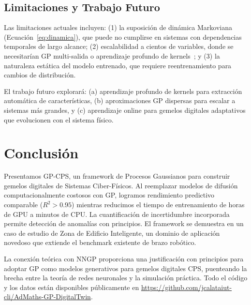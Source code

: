 \documentclass[conference]{IEEEtran}
\begin{document}
\subsection{Limitaciones y Trabajo Futuro}
Las limitaciones actuales incluyen: (1) la suposición de dinámica Markoviana (Ecuación~\ref{eq:dinamica}), que puede no cumplirse en sistemas con dependencias temporales de largo alcance; (2) escalabilidad a cientos de variables, donde se necesitarían GP multi-salida o aprendizaje profundo de kernels~\cite{wilson2016}; y (3) la naturaleza estática del modelo entrenado, que requiere reentrenamiento para cambios de distribución.

El trabajo futuro explorará: (a) aprendizaje profundo de kernels para extracción automática de características, (b) aproximaciones GP dispersas para escalar a sistemas más grandes, y (c) aprendizaje online para gemelos digitales adaptativos que evolucionen con el sistema físico.

\section{Conclusión}
\label{sec:conclusion}

Presentamos GP-CPS, un framework de Procesos Gaussianos para construir gemelos digitales de Sistemas Ciber-Físicos. Al reemplazar modelos de difusión computacionalmente costosos con GP, logramos rendimiento predictivo comparable ($R^2 > 0.95$) mientras reducimos el tiempo de entrenamiento de horas de GPU a minutos de CPU. La cuantificación de incertidumbre incorporada permite detección de anomalías con principios. El framework se demuestra en un caso de estudio de Zona de Edificio Inteligente, un dominio de aplicación novedoso que extiende el benchmark existente de brazo robótico.

La conexión teórica con NNGP proporciona una justificación con principios para adoptar GP como modelos generativos para gemelos digitales CPS, puenteando la brecha entre la teoría de redes neuronales y la simulación práctica. Todo el código y los datos están disponibles públicamente en \url{https://github.com/jcalataiut-cli/AdMaths-GP-DigitalTwin}.
\end{document}

